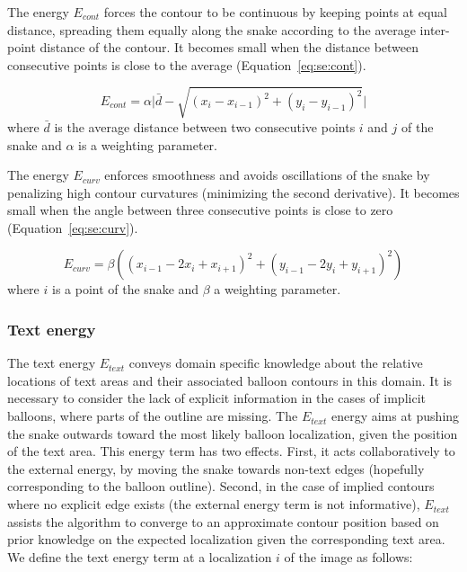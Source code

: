 The energy $E_{cont}$ forces the contour to be continuous by keeping points at equal distance, spreading them equally along the snake according to the average inter-point distance of the contour.
It becomes small when the distance between consecutive points is close to the average (Equation~\ref{eq:se:cont}).

\begin{equation}\label{eq:se:cont}
 E_{cont} = \alpha \Big|\bar{d} - \sqrt{(x_i - x_{i-1} )^2 + (y_i - y_{i-1} )^2}\Big|
\end{equation}
where $\bar{d}$ is the average distance between two consecutive points $i$ and $j$ of the snake and $\alpha$ is a weighting parameter.

The energy $E_{curv}$ enforces smoothness and avoids oscillations of the snake by penalizing high contour curvatures (minimizing the second derivative).
It becomes small when the angle between three consecutive points is close to zero (Equation~\ref{eq:se:curv}).

\begin{equation}\label{eq:se:curv}
  E_{curv} = \beta \left( (x_{i-1} - 2x_{i} + x_{i+1})^2 + (y_{i-1} - 2y_{i} + y_{i+1})^2 \right)
\end{equation}
where $i$ is a point of the snake and $\beta$ a weighting parameter.


\subsubsection{Text energy}
\label{sec:se:text_energie}

The text energy $E_{text}$ conveys domain specific knowledge about the relative locations of text areas and their associated balloon contours in this domain.
It is necessary to consider the lack of explicit information in the cases of implicit balloons, where parts of the outline are missing.
The $E_{text}$ energy aims at pushing the snake outwards toward the most likely balloon localization, given the position of the text area.
This energy term has two effects.
First, it acts collaboratively to the external energy, by moving the snake towards non-text edges (hopefully corresponding to the balloon outline).
Second, in the case of implied contours where no explicit edge exists (the external energy term is not informative), $E_{text}$ assists the algorithm to converge to an approximate contour position based on prior knowledge on the expected localization given the corresponding text area.
We define the text energy term at a localization $i$ of the image as follows:

